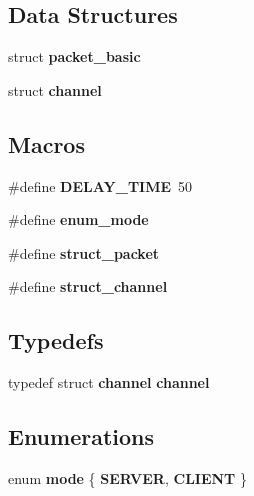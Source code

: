 \subsection*{Data Structures}
\begin{DoxyCompactItemize}
\item 
struct {\bf packet\+\_\+basic}
\item 
struct {\bf channel}
\end{DoxyCompactItemize}
\subsection*{Macros}
\begin{DoxyCompactItemize}
\item 
\#define {\bf D\+E\+L\+A\+Y\+\_\+\+T\+I\+ME}~50
\item 
\#define {\bf enum\+\_\+mode}
\item 
\#define {\bf struct\+\_\+packet}
\item 
\#define {\bf struct\+\_\+channel}
\end{DoxyCompactItemize}
\subsection*{Typedefs}
\begin{DoxyCompactItemize}
\item 
typedef struct {\bf channel} {\bf channel}
\end{DoxyCompactItemize}
\subsection*{Enumerations}
\begin{DoxyCompactItemize}
\item 
enum {\bf mode} \{ {\bf S\+E\+R\+V\+ER}, 
{\bf C\+L\+I\+E\+NT}
 \}
\end{DoxyCompactItemize}
